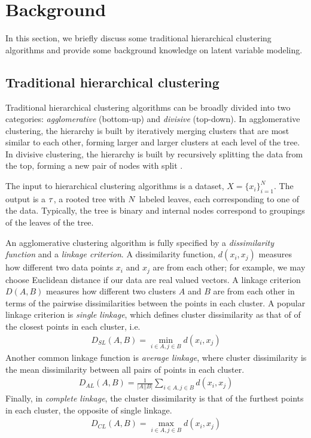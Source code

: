 \section{Background}

In this section, we briefly discuss
some traditional hierarchical clustering algorithms
and provide some
background knowledge on latent variable modeling.

\subsection{Traditional hierarchical clustering}
Traditional hierarchical clustering algorithms
can be broadly divided into two categories:
\emph{agglomerative} (bottom-up) and \emph{divisive} (top-down).
In agglomerative clustering, the hierarchy
is built by iteratively merging clusters
that are most similar to each other, forming
larger and larger clusters at each level
of the tree.
In divisive clustering,
the hierarchy is built by recursively
splitting the data from the top,
forming a new pair of nodes with 
split \cite{Hastie2009}.

The input to hierarchical clustering algorithms
is a dataset, $X = \{x_i\}_{i = 1}^N$.
The output is a $\tau$,
a rooted tree with $N$
labeled leaves,
each corresponding to one of the data.
Typically, the tree is binary
and internal nodes correspond
to groupings of the leaves
of the tree.

An agglomerative clustering algorithm is fully specified
by a \emph{dissimilarity function} and a \emph{linkage criterion}.
A dissimilarity function,
$d(x_i, x_j)$ measures
how different two data points $x_i$ and $x_j$ are from each other;
for example, we may choose Euclidean distance 
if our data are real valued vectors.
A linkage criterion $D(A, B)$ measures how different two clusters
$A$ and $B$
are from each other in terms of the pairwise
dissimilarities between the points in each cluster.
A popular linkage criterion is
\emph{single linkage}, which defines
cluster dissimilarity
as that of
of the closest points in 
each cluster,
i.e.
\begin{align}
  D_{SL}(A, B) = \min_{i\in A, j \in B} d(x_i, x_j)
\end{align}
Another common linkage function is \emph{average linkage}, 
where cluster dissimilarity is
the mean dissimilarity between
all pairs of points in each cluster.
\begin{align}
  D_{AL}(A, B) = \frac{1}{|A||B|}\sum_{i\in A, j \in B} d(x_i, x_j)
\end{align}
Finally, in \emph{complete linkage}, the cluster
dissimilarity
is that of the furthest points in each cluster,
the opposite of single linkage.
\begin{align}
  D_{CL}(A, B) = \max_{i\in A, j \in B} d(x_i, x_j)
\end{align}

